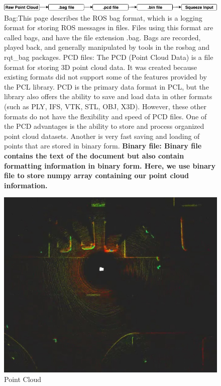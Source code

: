 \documentclass[final]{cvpr}
\begin{document}
\begin{figure}[h]
\centering
\includegraphics[width=1\linewidth]{robot pipeline.png}
\caption{Bag:This page describes the ROS bag format, which is a logging format for storing ROS messages in files. Files using this format are called bags, and have the file extension .bag. Bags are recorded, played back, and generally manipulated by tools in the rosbag and rqt_bag packages.
PCD files: The PCD (Point Cloud Data) is a file format for storing 3D point cloud data. It was created because existing formats did not support some of the features provided by the PCL library. PCD is the primary data format in PCL, but the library also offers the ability to save and load data in other formats (such as PLY, IFS, VTK, STL, OBJ, X3D). However, these other formats do not have the flexibility and speed of PCD files. One of the PCD advantages is the ability to store and process organized point cloud datasets. Another is very fast saving and loading of points that are stored in binary form.
\textbf{Binary file: Binary file contains the text of the document but also contain formatting information in binary form. Here, we use binary file to store numpy array containing our point cloud information.}
}\end{figure}

\begin{figure}[h]
\centering
\includegraphics[width=1\linewidth]{latex/pc.jpg}
\caption{Point Cloud}
\end{figure}
\end{document}
